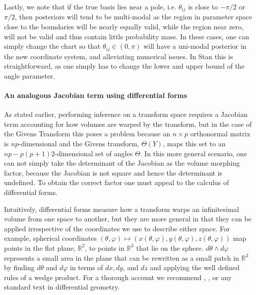 \documentclass{article}
\begin{document}
Lastly, we note that if the true basis lies near a pole, i.e. $\theta_{ij}$ is close to $-\pi/2$ or $\pi/2$, then posteriors will tend to be multi-modal as the region in parameter space close to the boundaries will be nearly equally valid, while the region near zero, will not be valid and thus contain little probability mass. In these cases, one can simply change the chart so that $\theta_{ij} \in (0, \pi)$ will have a uni-modal posterior in the new coordinate system, and alleviating numerical issues. In Stan this is straightforward, as one simply has to change the lower and upper bound of the angle parameter.

\paragraph{An analogous Jacobian term using differential forms} As stated earlier, performing inference on a transform space requires a Jacobian term accounting for how volumes are warped by the transform, but in the case of the Givens Transform this poses a problem because an $n \times p$ orthonormal matrix is $np$-dimensional and the Givens transform, $\Theta(Y)$, maps this set to an $np - p(p+1)2$-dimensional set of angles $\Theta$. In this more general scenario, one can not simply take the determinant of the Jacobian as the volume morphing factor, because the Jacobian is not square and hence the determinant is undefined. To obtain the correct factor one must appeal to the calculus of differential forms. 

Intuitively, differential forms measure how a transform warps an infinitesimal volume from one space to another, but they are more general in that they can be applied irrespective of the coordinates we use to describe either space. For example, spherical coordinates $(\theta, \varphi) \mapsto (x(\theta,\varphi), y(\theta,\varphi), z(\theta,\varphi))$ map points in the flat plane, $\mathbb{R}^2$, to points in $\mathbb{R}^3$ that lie on the sphere. $d\theta \wedge d\varphi$ represents a small area in the plane that can be rewritten as a small patch in $\mathbb{R}^3$ by finding $d\theta$ and $d\varphi$ in terms of $dx, dy$, and $dz$ and applying the well defined rules of a wedge product. For a thorough account we recommend \citet{muirhead2009aspects}, \citet{edelman200518}, or any standard text in differential geometry.
\end{document}
